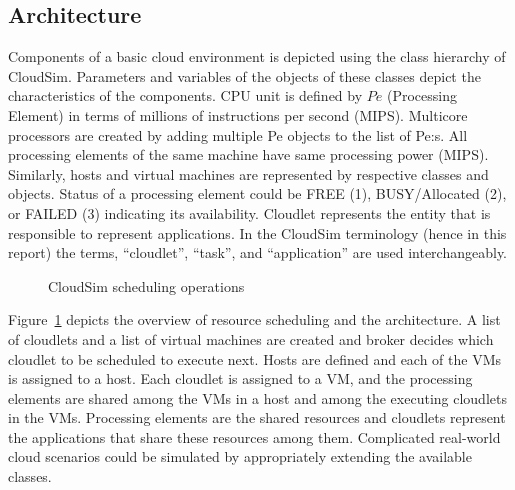 \documentclass{llncs}
\begin{document}
\subsection{Architecture}
Components of a basic cloud environment is depicted using the class hierarchy of CloudSim. Parameters and variables of the objects of these classes depict the characteristics of the components. CPU unit is defined by $Pe$ (Processing Element) in terms of millions of instructions per second (MIPS). Multicore processors are created by adding multiple Pe objects to the list of Pe:s. All processing elements of the same machine have same processing power (MIPS). Similarly, hosts and virtual machines are represented by respective classes and objects. Status of a processing element could be FREE (1), BUSY/Allocated (2), or FAILED (3) indicating its availability. Cloudlet represents the entity that is responsible to represent applications. In the CloudSim terminology (hence in this report) the terms, ``cloudlet'', ``task'', and ``application'' are used interchangeably.
\begin{figure}[ht]
 \caption{CloudSim scheduling operations}
 \label{fig:scheduling}
\end{figure}
Figure~\ref{fig:scheduling} depicts the overview of resource scheduling and the architecture. A list of cloudlets and a list of virtual machines are created and broker decides which cloudlet to be scheduled to execute next. Hosts are defined and each of the VMs is assigned to a host. Each cloudlet is assigned to a VM, and the processing elements are shared among the VMs in a host and among the executing cloudlets in the VMs. Processing elements are the shared resources and cloudlets represent the applications that share these resources among them. Complicated real-world cloud scenarios could be simulated by appropriately extending the available classes.
\end{document}
